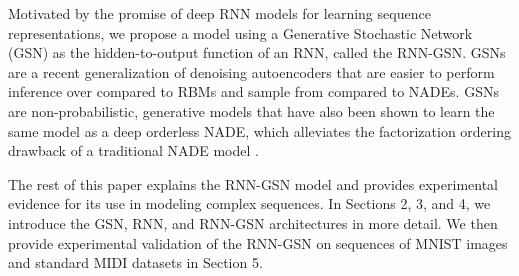 Motivated by the promise of deep RNN models for learning sequence representations, we propose a model using a Generative Stochastic Network (GSN) as the hidden-to-output function of an RNN, called the RNN-GSN. GSNs are a recent generalization of denoising autoencoders \cite{gsn} that are easier to perform inference over compared to RBMs and sample from compared to NADEs. GSNs are non-probabilistic, generative models that have also been shown to learn the same model as a deep orderless NADE, which alleviates the factorization ordering drawback of a traditional NADE model \cite{gsn_nade}.

The rest of this paper explains the RNN-GSN model and provides experimental evidence for its use in modeling complex sequences. In Sections 2, 3, and 4, we introduce the GSN, RNN, and RNN-GSN architectures in more detail. We then provide experimental validation of the RNN-GSN on sequences of MNIST images and standard MIDI datasets in Section 5.